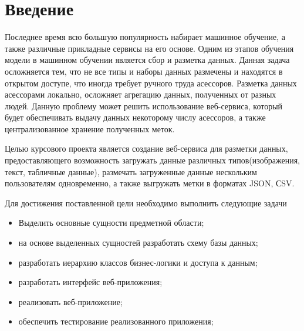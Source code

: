 \section*{Введение}

Последнее время всю большую популярность набирает машинное обучение, а также различные прикладные
сервисы на его основе. Одним из этапов обучения модели в машинном обучении является сбор и разметка данных. Данная задача осложняется
тем, что не все типы и наборы данных размечены и находятся в открытом доступе, что иногда требует ручного труда асессоров. Разметка
данных асессорами локально, осложняет агрегацию данных, полученных от разных людей. Данную проблему может решить использование веб-сервиса,
который будет обеспечивать выдачу данных некоторому числу асессоров, а также централизованное хранение полученных меток. 

Целью курсового проекта является создание веб-сервиса для разметки данных,
предоставляющего возможность загружать данные различных типов(изображения, текст, табличные данные), размечать загруженные данные нескольким
пользователям одновременно, а также выгружать метки в форматах JSON, СSV.

Для достижения поставленной цели необходимо выполнить следующие задачи 

\begin{itemize}
    \item Выделить основные сущности предметной области;
    \item на основе выделенных сущностей разработать схему базы данных;
    \item разработать иерархию классов бизнес-логики и доступа к данным;
    \item разработать интерфейс веб-приложения;
    \item реализовать веб-приложение;
    \item обеспечить тестирование реализованного приложения;
\end{itemize}